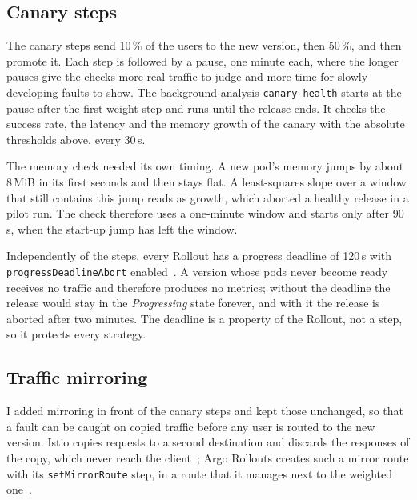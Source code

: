 \subsection{Canary steps}
\label{sec:DesignCanary}
The canary steps send 10\,\% of the users to the new version, then 50\,\%, and then promote it. Each step is followed by a pause, one minute each, where the longer pauses give the checks more real traffic to judge and more time for slowly developing faults to show. The background analysis \texttt{canary-health} starts at the pause after the first weight step and runs until the release ends. It checks the success rate, the latency and the memory growth of the canary with the absolute thresholds above, every 30\,s.

The memory check needed its own timing. A new pod's memory jumps by about 8\,MiB in its first seconds and then stays flat. A least-squares slope over a window that still contains this jump reads as growth, which aborted a healthy release in a pilot run. The check therefore uses a one-minute window and starts only after 90\,s, when the start-up jump has left the window.

Independently of the steps, every Rollout has a progress deadline of 120\,s with \texttt{progressDeadlineAbort} enabled~\cite{ArgoRolloutsSpec}. A version whose pods never become ready receives no traffic and therefore produces no metrics; without the deadline the release would stay in the \emph{Progressing} state forever, and with it the release is aborted after two minutes. The deadline is a property of the Rollout, not a step, so it protects every strategy.

\subsection{Traffic mirroring}
\label{sec:DesignMirror}
I added mirroring in front of the canary steps and kept those unchanged, so that a fault can be caught on copied traffic before any user is routed to the new version. Istio copies requests to a second destination and discards the responses of the copy, which never reach the client~\cite{IstioMirroring}; Argo Rollouts creates such a mirror route with its \texttt{setMirrorRoute} step, in a route that it manages next to the weighted one~\cite{ArgoRolloutsTraffic}.

